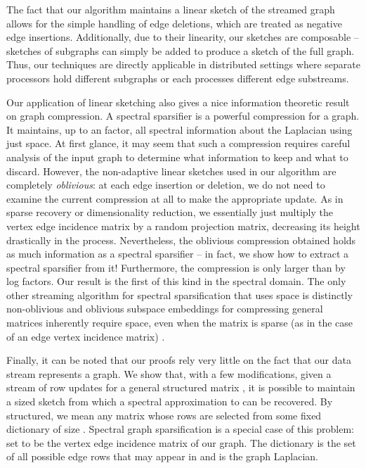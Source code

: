 \documentclass[11pt]{article}
\begin{document}
The fact that our algorithm maintains a linear sketch of the streamed graph allows for the 
simple handling of edge deletions, which are treated as negative edge insertions. Additionally,  due to their linearity, our sketches are composable -- sketches of subgraphs can simply be added to produce a sketch of the full graph. Thus, our techniques are directly applicable in distributed settings where separate processors hold different subgraphs or each processes different edge substreams. 

Our application of linear sketching also gives a nice information theoretic result on graph compression. A spectral sparsifier is a powerful compression for a graph. It maintains, up to an  factor, all spectral information about the Laplacian using just  space. At first glance, it may seem that such a compression requires careful analysis of the input graph to determine what information to keep and what to discard. However, the non-adaptive linear sketches used in our algorithm are completely \emph{oblivious}: at each edge insertion or deletion, we do not need to examine the current compression at all to make the appropriate update. As in sparse recovery or dimensionality reduction, we essentially just multiply the vertex edge incidence matrix by a random projection matrix, decreasing its height drastically in the process. Nevertheless, the oblivious compression obtained holds as much information as a spectral sparsifier -- in fact, we show how to extract a spectral sparsifier from it! Furthermore, the compression is only larger than  by log factors. Our result is the first of this kind in the spectral domain. The only other streaming algorithm for spectral sparsification that uses  space is distinctly non-oblivious \cite{kelner2011spectral} and oblivious subspace embeddings for compressing general matrices inherently require  space, even when the matrix is sparse (as in the case of an edge vertex incidence matrix) \cite{sarlos2006improved,clarkson2013low, meng2013, osnap}.

Finally, it can be noted that our proofs rely very little on the fact that our data stream represents a graph. We show that, with a few modifications, given a stream of row updates for a general structured matrix , it is possible to maintain a  sized sketch from which a spectral approximation to  can be recovered. By structured, we mean any matrix whose rows are selected from some fixed dictionary of size . Spectral graph sparsification is a special case of this problem: set  to be the vertex edge incidence matrix of our graph. The dictionary is the set of all possible  edge rows that may appear in  and  is the graph Laplacian.  
\end{document}
